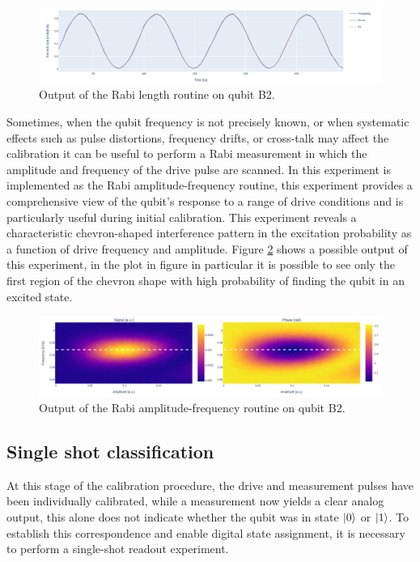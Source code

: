 \begin{figure}[h!]
    \centering
    \includegraphics[width=\textwidth]{figures/png/rabi_length.png}
    \caption{Output of the Rabi length routine on qubit B2.}
    \label{fig:rabi_length}
\end{figure}


Sometimes, when the qubit frequency is not precisely known, or when systematic effects such as pulse distortions, frequency drifts, or cross-talk may affect the calibration it can be useful to perform a Rabi measurement in which the amplitude and frequency of the drive pulse are scanned.
In \Qibocal this experiment is implemented as the Rabi amplitude-frequency routine, this experiment provides a comprehensive view of the qubit's response to a range of drive conditions and is particularly useful during initial calibration.
This experiment reveals a characteristic chevron-shaped interference pattern in the excitation probability as a function of drive frequency and amplitude. 
Figure \ref{fig:rabi_amplitude_frequency} shows a possible output of this experiment, in the plot in figure in particular it is possible to see only the first region of the chevron shape with high probability of finding the qubit in an excited state.

\begin{figure}[h!]
    \centering
    \includegraphics[width=\textwidth]{figures/png/rabi_af.png}
    \caption{Output of the Rabi amplitude-frequency routine on qubit B2.}
    \label{fig:rabi_amplitude_frequency}
\end{figure}

\subsection{Single shot classification}\label{subsec:single_shot}
At this stage of the calibration procedure, the drive and measurement pulses have been individually calibrated, while a measurement now yields a clear analog output, this alone does not indicate whether the qubit was in state $\ket{0}$ or $\ket{1}$.
To establish this correspondence and enable digital state assignment, it is necessary to perform a single-shot readout experiment.

